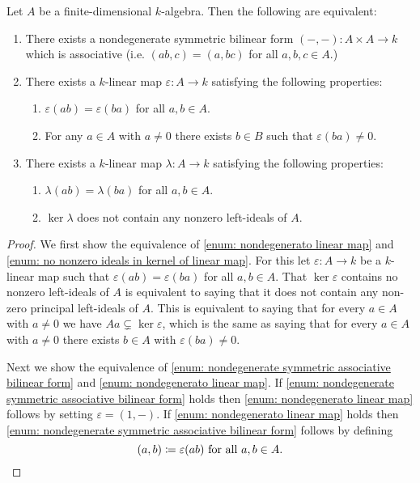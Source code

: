 \begin{prop}
  Let $A$ be a finite-dimensional $k$-algebra. Then the following are equivalent:
  \begin{enumerate}[label=\emph{\roman*)},leftmargin=*]
    \item \label{enum: nondegenerate symmetric associative bilinear form}
      There exists a nondegenerate symmetric bilinear form $(-,-) \colon A \times A \to k$ which is associative (i.e. $(ab,c) = (a,bc)$ for all $a,b,c \in A$.)
    \item \label{enum: nondegenerato linear map}
      There exists a $k$-linear map $\varepsilon \colon A \to k$ satisfying the following properties:
      \begin{enumerate}[label=\emph{(\roman*)},leftmargin=*]
        \item
          $\varepsilon(ab) = \varepsilon(ba)$ for all $a,b \in A$.
        \item
          For any $a \in A$ with $a \neq 0$ there exists $b \in B$ such that $\varepsilon(ba) \neq 0$.
      \end{enumerate}
    \item \label{enum: no nonzero ideals in kernel of linear map}
      There exists a $k$-linear map $\lambda \colon A \to k$ satisfying the following properties:
      \begin{enumerate}[label=\emph{(\roman*)},leftmargin=*]
        \item
          $\lambda(ab) = \lambda(ba)$ for all $a,b \in A$.
        \item
          $\ker \lambda$ does not contain any nonzero left-ideals of $A$.
      \end{enumerate}
  \end{enumerate}
\end{prop}
\begin{proof}
  We first show the equivalence of \ref{enum: nondegenerato linear map} and \ref{enum: no nonzero ideals in kernel of linear map}. For this let $\varepsilon \colon A \to k$ be a $k$-linear map such that $\varepsilon(ab) = \varepsilon(ba)$ for all $a,b \in A$. That $\ker \varepsilon$ contains no nonzero left-ideals of $A$ is equivalent to saying that it does not contain any non-zero principal left-ideals of $A$. This is equivalent to saying that for every $a \in A$ with $a \neq 0$ we have $Aa \subsetneq \ker \varepsilon$, which is the same as saying that for every $a \in A$ with $a \neq 0$ there exists $b \in A$ with $\varepsilon(ba) \neq 0$.
  
  Next we show the equivalence of \ref{enum: nondegenerate symmetric associative bilinear form} and \ref{enum: nondegenerato linear map}. If \ref{enum: nondegenerate symmetric associative bilinear form} holds then \ref{enum: nondegenerato linear map} follows by setting $\varepsilon = (1,-)$. If \ref{enum: nondegenerato linear map} holds then \ref{enum: nondegenerate symmetric associative bilinear form} follows by defining
  \[
    (a,b) \coloneqq \varepsilon(ab) \text{ for all } a,b \in A.
    \qedhere
  \]
\end{proof}



